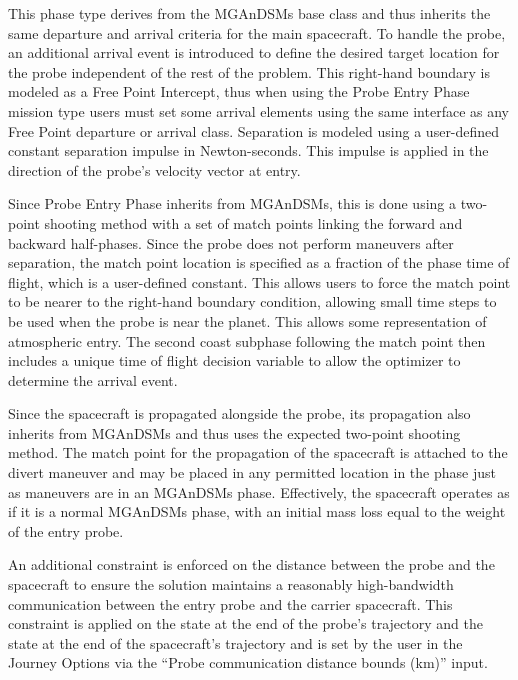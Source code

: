 \noindent This phase type derives from the \ac{MGAnDSMs} base class and thus inherits the same departure and arrival criteria for the main spacecraft. To handle the probe, an additional arrival event is introduced to define the desired target location for the probe independent of the rest of the problem. This right-hand boundary is modeled as a Free Point Intercept, thus when using the Probe Entry Phase mission type users must set some arrival elements using the same interface as any Free Point departure or arrival class. Separation is modeled using a user-defined constant separation impulse in Newton-seconds. This impulse is applied in the direction of the probe's velocity vector at entry.  

\noindent Since Probe Entry Phase inherits from \ac{MGAnDSMs}, this is done using a two-point shooting method with a set of match points linking the forward and backward half-phases. Since the probe does not perform maneuvers after separation, the match point location is specified as a fraction of the phase time of flight, which is a user-defined constant. This allows users to force the match point to be nearer to the right-hand boundary condition, allowing small time steps to be used when the probe is near the planet. This allows some representation of atmospheric entry. The second coast subphase following the match point then includes a unique time of flight decision variable to allow the optimizer to determine the arrival event.

\noindent Since the spacecraft is propagated alongside the probe, its propagation also inherits from \ac{MGAnDSMs} and thus uses the expected two-point shooting method. The match point for the propagation of the spacecraft is attached to the divert maneuver and may be placed in any permitted location in the phase just as maneuvers are in an \ac{MGAnDSMs} phase. Effectively, the spacecraft operates as if it is a normal \ac{MGAnDSMs} phase, with an initial mass loss equal to the weight of the entry probe.

\noindent An additional constraint is enforced on the distance between the probe and the spacecraft to ensure the solution maintains a reasonably high-bandwidth communication between the entry probe and the carrier spacecraft. This constraint is applied on the state at the end of the probe's trajectory and the state at the end of the spacecraft's trajectory and is set by the user in the Journey Options via the ``Probe communication distance bounds (km)'' input.


